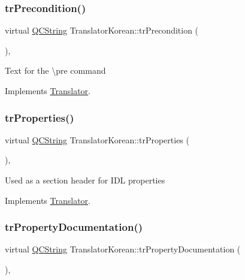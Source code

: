 \subsubsection{\texorpdfstring{trPrecondition()}{trPrecondition()}}
{\footnotesize\ttfamily virtual \mbox{\hyperlink{class_q_c_string}{Q\+C\+String}} Translator\+Korean\+::tr\+Precondition (\begin{DoxyParamCaption}{ }\end{DoxyParamCaption})\hspace{0.3cm}{\ttfamily [inline]}, {\ttfamily [virtual]}}

Text for the \textbackslash{}pre command 

Implements \mbox{\hyperlink{class_translator}{Translator}}.

\mbox{\label{class_translator_korean_a0bc3ea70a010f0ffe0f1acc321a78b1d}} 
\subsubsection{\texorpdfstring{trProperties()}{trProperties()}}
{\footnotesize\ttfamily virtual \mbox{\hyperlink{class_q_c_string}{Q\+C\+String}} Translator\+Korean\+::tr\+Properties (\begin{DoxyParamCaption}{ }\end{DoxyParamCaption})\hspace{0.3cm}{\ttfamily [inline]}, {\ttfamily [virtual]}}

Used as a section header for I\+DL properties 

Implements \mbox{\hyperlink{class_translator}{Translator}}.

\mbox{\label{class_translator_korean_a8b6ba1e21463d1f6a4784eb1370f624a}} 
\subsubsection{\texorpdfstring{trPropertyDocumentation()}{trPropertyDocumentation()}}
{\footnotesize\ttfamily virtual \mbox{\hyperlink{class_q_c_string}{Q\+C\+String}} Translator\+Korean\+::tr\+Property\+Documentation (\begin{DoxyParamCaption}{ }\end{DoxyParamCaption})\hspace{0.3cm}{\ttfamily [inline]}, {\ttfamily [virtual]}}

